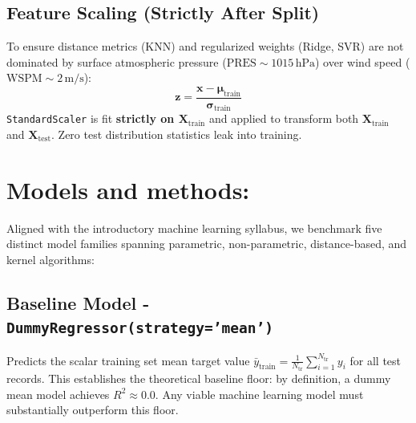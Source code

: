 \documentclass[a4paper,12pt,twocolumn]{article}
\begin{document}
\subsection{Feature Scaling (Strictly After Split)}
To ensure distance metrics (KNN) and regularized weights (Ridge, SVR) are not dominated by surface atmospheric pressure ($\text{PRES} \sim 1015\,\text{hPa}$) over wind speed ($\text{WSPM} \sim 2\,\text{m/s}$):
\begin{equation}
\mathbf{z} = \frac{\mathbf{x} - \boldsymbol{\mu}_{\text{train}}}{\boldsymbol{\sigma}_{\text{train}}}
\end{equation}
\texttt{StandardScaler} is fit \textbf{strictly on $\mathbf{X}_{\text{train}}$} and applied to transform both $\mathbf{X}_{\text{train}}$ and $\mathbf{X}_{\text{test}}$. Zero test distribution statistics leak into training.

\section{Models and methods:}
\label{sec:models}
Aligned with the introductory machine learning syllabus, we benchmark five distinct model families spanning parametric, non-parametric, distance-based, and kernel algorithms:

\subsection{Baseline Model - \texttt{DummyRegressor(strategy='mean')}}
Predicts the scalar training set mean target value $\bar{y}_{\text{train}} = \frac{1}{N_{\text{tr}}} \sum_{i=1}^{N_{\text{tr}}} y_i$ for all test records. This establishes the theoretical baseline floor: by definition, a dummy mean model achieves $R^2 \approx 0.0$. Any viable machine learning model must substantially outperform this floor.
\end{document}
